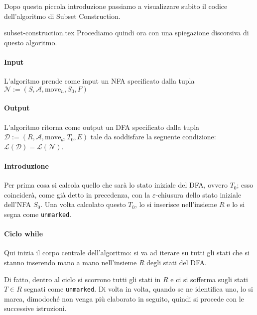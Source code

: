 \documentclass[class=book, crop=false, oneside, 12pt]{standalone}
\begin{document}
Dopo questa piccola introduzione passiamo a visualizzare subito il codice dell'algoritmo di Subset Construction.

{subset-construction.tex} 
\noindent Procediamo quindi ora con una spiegazione discorsiva di questo algoritmo.
\paragraph*{Input}
L'algoritmo prende come input un NFA specificato dalla tupla \(\mathcal{N} := (S, \mathcal{A}, \textrm{move}_n, S_0, F)\)

\paragraph*{Output}
L'algoritmo ritorna come output un DFA specificato dalla tupla \(\mathcal{D} := (R, \mathcal{A}, \textrm{move}_d, T_0, E)\) tale da soddisfare la seguente condizione: \(\mathcal{L}(\mathcal{D}) = \mathcal{L}(\mathcal{N})\).

\paragraph*{Introduzione}
Per prima cosa si calcola quello che sarà lo stato iniziale del DFA, ovvero \(T_0\); esso coinciderà, come già detto in precedenza, con la \(\varepsilon\)-chiusura dello stato iniziale dell'NFA \(S_0\). Una volta calcolato questo \(T_0\),  lo si inserisce nell'insieme \(R\) e lo si segna come \texttt{unmarked}.

\paragraph*{Ciclo while}
Qui inizia il corpo centrale dell'algoritmo: si va ad iterare su tutti gli stati che si stanno inserendo mano a mano nell'insieme \(R\) degli stati del DFA. 

Di fatto, dentro al ciclo si scorrono tutti gli stati in \(R\) e ci si sofferma sugli stati \(T \in R\) segnati come \texttt{unmarked}. Di volta in volta, quando se ne identifica uno, lo si marca, dimodoché non venga più elaborato in seguito, quindi si procede con le successive istruzioni.
\end{document}
